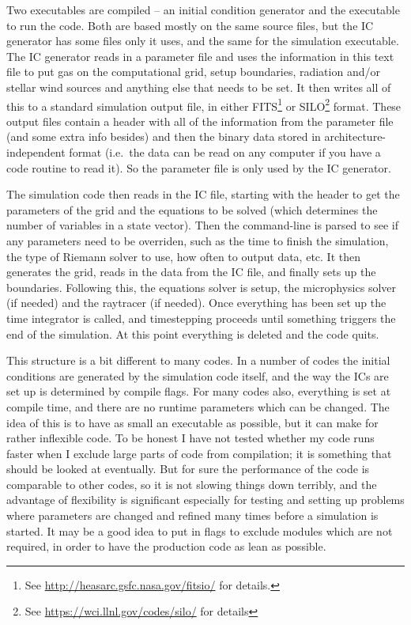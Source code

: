 \documentclass[a4paper,11pt]{report}
\begin{document}
Two executables are compiled -- an initial condition generator and the executable to run the code.
Both are based mostly on the same source files, but the IC generator has some files only it uses, and the same for the simulation executable.
The IC generator reads in a parameter file and uses the information in this text file to put gas on the computational grid, setup boundaries, radiation and/or stellar wind sources and anything else that needs to be set.
It then writes all of this to a standard simulation output file, in either FITS\footnote{See \url{http://heasarc.gsfc.nasa.gov/fitsio/} for details.} or SILO\footnote{See \url{https://wci.llnl.gov/codes/silo/} for details} format.
These output files contain a header with all of the information from the parameter file (and some extra info besides) and then the binary data stored in architecture-independent format (i.e.\ the data can be read on any computer if you have a code routine to read it).
So the parameter file is only used by the IC generator.

The simulation code then reads in the IC file, starting with the header to get the parameters of the grid and the equations to be solved (which determines the number of variables in a state vector).
Then the command-line is parsed to see if any parameters need to be overriden, such as the time to finish the simulation, the type of Riemann solver to use, how often to output data, etc.
It then generates the grid, reads in the data from the IC file, and finally sets up the boundaries.
Following this, the equations solver is setup, the microphysics solver (if needed) and the raytracer (if needed).
Once everything has been set up the time integrator is called, and timestepping proceeds until something triggers the end of the simulation.
At this point everything is deleted and the code quits.

This structure is a bit different to many codes.
In a number of codes the initial conditions are generated by the simulation code itself, and the way the ICs are set up is determined by compile flags.
For many codes also, everything is set at compile time, and there are no runtime parameters which can be changed.
The idea of this is to have as small an executable as possible, but it can make for rather inflexible code.
To be honest I have not tested whether my code runs faster when I exclude large parts of code from compilation; it is something that should be looked at eventually.
But for sure the performance of the code is comparable to other codes, so it is not slowing things down terribly, and the advantage of flexibility is significant especially for testing and setting up problems where parameters are changed and refined many times before a simulation is started.
It may be a good idea to put in flags to exclude modules which are not required, in order to have the production code as lean as possible.
\end{document}
